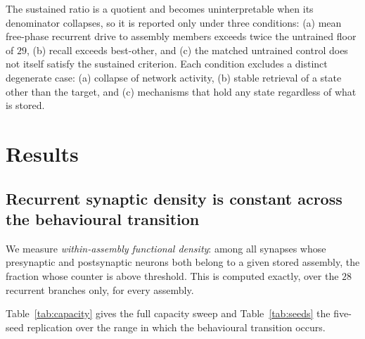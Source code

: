 \documentclass[10pt,twocolumn,a4paper]{article}
\begin{document}
The sustained ratio is a quotient and becomes uninterpretable when its denominator
collapses, so it is reported only under three conditions: (a) mean free-phase recurrent
drive to assembly members exceeds twice the untrained floor of $29$, (b) recall exceeds
best-other, and (c) the matched untrained control does not itself satisfy the sustained
criterion. Each condition excludes a distinct degenerate case: (a) collapse of network
activity, (b) stable retrieval of a state other than the target, and (c) mechanisms that
hold any state regardless of what is stored.

\section{Results}
\label{sec:measured}

\subsection{Recurrent synaptic density is constant across the behavioural transition}
\label{sec:density}

We measure \emph{within-assembly functional density}: among all synapses whose
presynaptic and postsynaptic neurons both belong to a given stored assembly, the fraction
whose counter is above threshold. This is computed exactly, over the $28$ recurrent
branches only, for every assembly.

Table~\ref{tab:capacity} gives the full capacity sweep and Table~\ref{tab:seeds} the
five-seed replication over the range in which the behavioural transition occurs.
\end{document}
